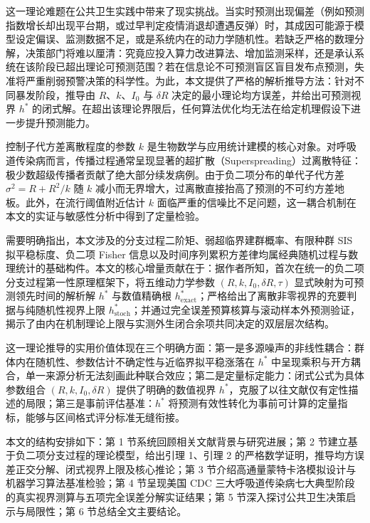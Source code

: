 \documentclass[11pt,a4paper]{article}
\theoremstyle{plain}
\theoremstyle{definition}
\begin{document}
这一理论难题在公共卫生实践中带来了现实挑战。当实时预测出现偏差（例如预测指数增长却出现平台期，或过早判定疫情消退却遭遇反弹）时，其成因可能源于模型设定偏误、监测数据不足，或是系统内在的动力学随机性。若缺乏严格的数理分解，决策部门将难以厘清：究竟应投入算力改进算法、增加监测采样，还是承认系统在该阶段已超出理论可预测范围？若在信息论不可预测盲区盲目发布点预测，失准将严重削弱预警决策的科学性。为此，本文提供了严格的解析推导方法：针对不同暴发阶段，推导由 $R$、$k$、$I_0$ 与 $\delta R$ 决定的最小理论均方误差，并给出可预测视界 $h^*$ 的闭式解。在超出该理论界限后，任何算法优化均无法在给定机理假设下进一步提升预测能力。

控制子代方差离散程度的参数 $k$ 是生物数学与应用统计建模的核心对象。对呼吸道传染病而言，传播过程通常呈现显著的超扩散（Superspreading）过离散特征：极少数超级传播者贡献了绝大部分续发病例\citep{lloyd-smith2005superspreading, endo2020overdispersion}。由于负二项分布的单代子代方差 $\sigma^2 = R + R^2/k$ 随 $k$ 减小而无界增大，过离散直接抬高了预测的不可约方差地板。此外，在流行阈值附近估计 $k$ 面临严重的信噪比不足问题，这一耦合机制在本文的实证与敏感性分析中得到了定量检验。

需要明确指出，本文涉及的分支过程二阶矩\citep{athreya1972branching, bartlett1957measles}、弱超临界建群概率\citep{o2013theory}、有限种群 SIS 拟平稳标度\citep{nasell1999quasi, dolgoarshinnykh2006critical}、负二项 Fisher 信息\citep{johnson2021disease, lloyd2007maximum}以及时间序列累积方差律均属经典随机过程与数理统计的基础构件。本文的核心增量贡献在于：据作者所知，首次在统一的负二项分支过程第一性原理框架下，将五维动力学参数 $(R, k, I_0, \delta R, \tau)$ 显式映射为可预测领先时间的解析解 $h^*$ 与数值精确根 $h^*_{\text{exact}}$；严格给出了离散非零视界的充要判据与纯随机性视界上限 $h^*_{\text{stoch}}$；并通过完全误差预算核算与滚动样本外预测验证，揭示了由内在机制理论上限与实测外生闭合余项共同决定的双层层次结构。

这一理论推导的实用价值体现在三个明确方面：第一是多源噪声的非线性耦合：群体内在随机性、参数估计不确定性与近临界拟平稳涨落在 $h^*$ 中呈现乘积与开方耦合，单一来源分析无法刻画此种联合效应；第二是定量标定能力：闭式公式为具体参数组合 $(R,k,I_0,\delta R)$ 提供了明确的数值视界 $h^*$，克服了以往文献仅有定性描述的局限；第三是事前评估基准：$h^*$ 将预测有效性转化为事前可计算的定量指标，能够与区间格式评分标准\citep{bracher2021evaluating}无缝衔接。

本文的结构安排如下：第 1 节系统回顾相关文献背景与研究进展；第 2 节建立基于负二项分支过程的理论模型，给出引理 1、引理 2 的严格数学证明，推导均方误差正交分解、闭式视界上限及核心推论；第 3 节介绍高通量蒙特卡洛模拟设计与机器学习算法基准检验；第 4 节呈现美国 CDC 三大呼吸道传染病七大典型阶段的真实视界测算与五项完全误差分解实证结果；第 5 节深入探讨公共卫生决策启示与局限性；第 6 节总结全文主要结论。
\end{document}

